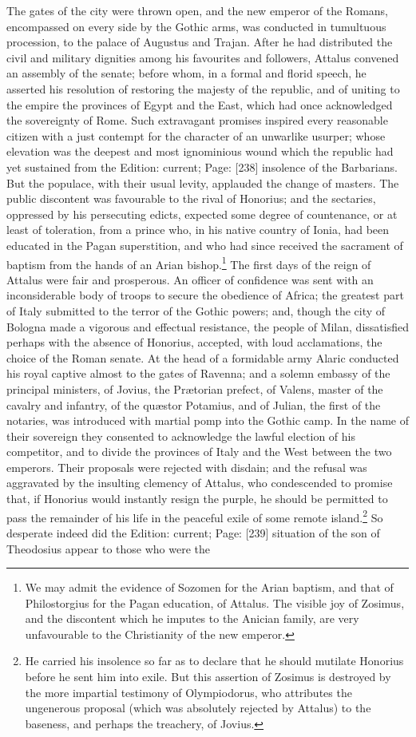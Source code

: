 The gates of the city were thrown open, and the new emperor of the Romans, encompassed on every side by the Gothic arms, was conducted in tumultuous procession, to the palace of Augustus and Trajan. After he had distributed the civil and military dignities among his favourites and followers, Attalus convened an assembly of the senate; before whom, in a formal and florid speech, he asserted his resolution of restoring the majesty of the republic, and of uniting to the empire the provinces of Egypt and the East, which had once acknowledged the sovereignty of Rome. Such extravagant promises inspired every reasonable citizen with a just contempt for the character of an unwarlike usurper; whose elevation was the deepest and most ignominious wound which the republic had yet sustained from the Edition: current; Page: [238] insolence of the Barbarians. But the populace, with their usual levity, applauded the change of masters. The public discontent was favourable to the rival of Honorius; and the sectaries, oppressed by his persecuting edicts, expected some degree of countenance, or at least of toleration, from a prince who, in his native country of Ionia, had been educated in the Pagan superstition, and who had since received the sacrament of baptism from the hands of an Arian bishop.\footnote{We may admit the evidence of Sozomen for the Arian baptism, and that of Philostorgius for the Pagan education, of Attalus. The visible joy of Zosimus, and the discontent which he imputes to the Anician family, are very unfavourable to the Christianity of the new emperor.} The first days of the reign of Attalus were fair and prosperous. An officer of confidence was sent with an inconsiderable body of troops to secure the obedience of Africa; the greatest part of Italy submitted to the terror of the Gothic powers; and, though the city of Bologna made a vigorous and effectual resistance, the people of Milan, dissatisfied perhaps with the absence of Honorius, accepted, with loud acclamations, the choice of the Roman senate. At the head of a formidable army Alaric conducted his royal captive almost to the gates of Ravenna; and a solemn embassy of the principal ministers, of Jovius, the Prætorian prefect, of Valens, master of the cavalry and infantry, of the quæstor Potamius, and of Julian, the first of the notaries, was introduced with martial pomp into the Gothic camp. In the name of their sovereign they consented to acknowledge the lawful election of his competitor, and to divide the provinces of Italy and the West between the two emperors. Their proposals were rejected with disdain; and the refusal was aggravated by the insulting clemency of Attalus, who condescended to promise that, if Honorius would instantly resign the purple, he should be permitted to pass the remainder of his life in the peaceful exile of some remote island.\footnote{He carried his insolence so far as to declare that he should mutilate Honorius before he sent him into exile. But this assertion of Zosimus is destroyed by the more impartial testimony of Olympiodorus, who attributes the ungenerous proposal (which was absolutely rejected by Attalus) to the baseness, and perhaps the treachery, of Jovius.} So desperate indeed did the Edition: current; Page: [239] situation of the son of Theodosius appear to those who were the 